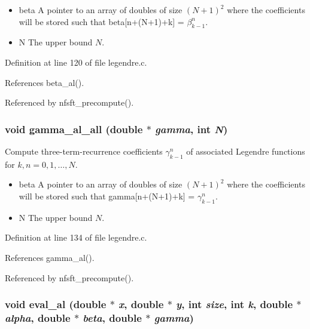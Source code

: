 \begin{itemize}
\item beta A pointer to an array of doubles of size $(N+1)^2$ where the coefficients will be stored such that beta\mbox{[}n+(N+1)+k\mbox{]} = $\beta_{k-1}^n$. \item N The upper bound $N$. \end{itemize}


Definition at line 120 of file legendre.c.

References beta\_\-al().

Referenced by nfsft\_\-precompute().\hypertarget{group__nfsft_ga20}{
\subsubsection[gamma\_\-al\_\-all]{\setlength{\rightskip}{0pt plus 5cm}void gamma\_\-al\_\-all (double $\ast$ {\em gamma}, int {\em N})}}
\label{group__nfsft_ga20}


Compute three-term-recurrence coefficients $\gamma_{k-1}^n$ of associated Legendre functions for $k,n = 0,1,\ldots,N$. 

\begin{itemize}
\item beta A pointer to an array of doubles of size $(N+1)^2$ where the coefficients will be stored such that gamma\mbox{[}n+(N+1)+k\mbox{]} = $\gamma_{k-1}^n$. \item N The upper bound $N$. \end{itemize}


Definition at line 134 of file legendre.c.

References gamma\_\-al().

Referenced by nfsft\_\-precompute().\hypertarget{group__nfsft_ga21}{
\subsubsection[eval\_\-al]{\setlength{\rightskip}{0pt plus 5cm}void eval\_\-al (double $\ast$ {\em x}, double $\ast$ {\em y}, int {\em size}, int {\em k}, double $\ast$ {\em alpha}, double $\ast$ {\em beta}, double $\ast$ {\em gamma})}}
\label{group__nfsft_ga21}


